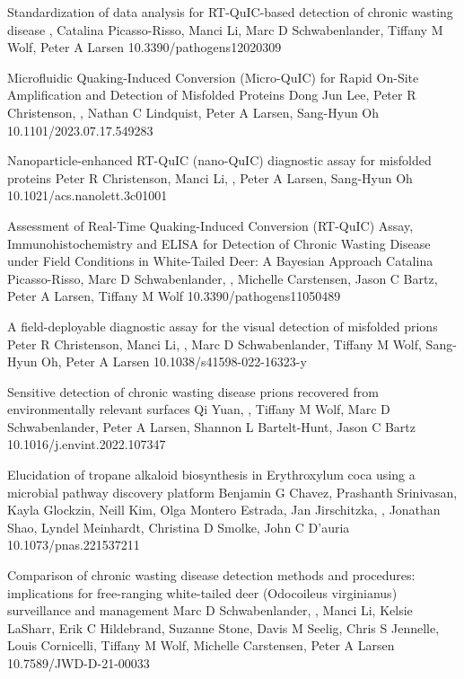 \documentclass{resume}
\begin{document}
\begin{samepage}
            {Standardization of data analysis for RT-QuIC-based detection of chronic wasting disease}
            {\me{}, Catalina Picasso-Risso, Manci Li, Marc D Schwabenlander, Tiffany M Wolf, Peter A Larsen}
            {10.3390/pathogens12020309}

            {Microfluidic Quaking-Induced Conversion (Micro-QuIC) for Rapid On-Site Amplification and Detection of Misfolded Proteins}
            {Dong Jun Lee, Peter R Christenson, \me{}, Nathan C Lindquist, Peter A Larsen, Sang-Hyun Oh}
            {10.1101/2023.07.17.549283}

            {Nanoparticle-enhanced RT-QuIC (nano-QuIC) diagnostic assay for misfolded proteins}
            {Peter R Christenson, Manci Li, \me{}, Peter A Larsen, Sang-Hyun Oh}
            {10.1021/acs.nanolett.3c01001}

            {Assessment of Real-Time Quaking-Induced Conversion (RT-QuIC) Assay, Immunohistochemistry and ELISA for Detection of Chronic Wasting Disease under Field Conditions in White-Tailed Deer: A Bayesian Approach}
            {Catalina Picasso-Risso, Marc D Schwabenlander, \me{}, Michelle Carstensen, Jason C Bartz, Peter A Larsen, Tiffany M Wolf}
            {10.3390/pathogens11050489}

            {A field-deployable diagnostic assay for the visual detection of misfolded prions}
            {Peter R Christenson, Manci Li, \me{}, Marc D Schwabenlander, Tiffany M Wolf, Sang-Hyun Oh, Peter A Larsen}
            {10.1038/s41598-022-16323-y}

            {Sensitive detection of chronic wasting disease prions recovered from environmentally relevant surfaces}
            {Qi Yuan, \me{}, Tiffany M Wolf, Marc D Schwabenlander, Peter A Larsen, Shannon L Bartelt-Hunt, Jason C Bartz}
            {10.1016/j.envint.2022.107347}

            {Elucidation of tropane alkaloid biosynthesis in Erythroxylum coca using a microbial pathway discovery platform}
            {Benjamin G Chavez, Prashanth Srinivasan, Kayla Glockzin, Neill Kim, Olga Montero Estrada, Jan Jirschitzka, \me{}, Jonathan Shao, Lyndel Meinhardt, Christina D Smolke, John C D’auria}
            {10.1073/pnas.221537211}

            {Comparison of chronic wasting disease detection methods and procedures: implications for free-ranging white-tailed deer (Odocoileus virginianus) surveillance and management}
            {Marc D Schwabenlander, \me{}, Manci Li, Kelsie LaSharr, Erik C Hildebrand, Suzanne Stone, Davis M Seelig, Chris S Jennelle, Louis Cornicelli, Tiffany M Wolf, Michelle Carstensen, Peter A Larsen}
            {10.7589/JWD-D-21-00033}
            

\end{samepage}
\end{document}
